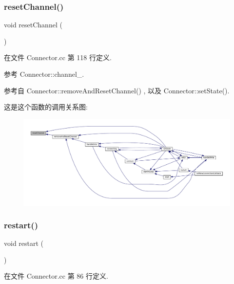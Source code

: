 \subsubsection{\texorpdfstring{reset\+Channel()}{resetChannel()}}
{\footnotesize\ttfamily void reset\+Channel (\begin{DoxyParamCaption}{ }\end{DoxyParamCaption})\hspace{0.3cm}{\ttfamily [private]}}



在文件 Connector.\+cc 第 118 行定义.



参考 Connector\+::channel\+\_\+.



参考自 Connector\+::remove\+And\+Reset\+Channel() , 以及 Connector\+::set\+State().

这是这个函数的调用关系图\+:
\nopagebreak
\begin{figure}[H]
\begin{center}
\leavevmode
\includegraphics[width=350pt]{classmuduo_1_1Connector_aeb215fb4b2ea3598389e881b87a49631_icgraph}
\end{center}
\end{figure}
\mbox{\label{classmuduo_1_1Connector_a22ee094ca3f45aa4156b97d34fe678bf}} 
\subsubsection{\texorpdfstring{restart()}{restart()}}
{\footnotesize\ttfamily void restart (\begin{DoxyParamCaption}{ }\end{DoxyParamCaption})}



在文件 Connector.\+cc 第 86 行定义.



